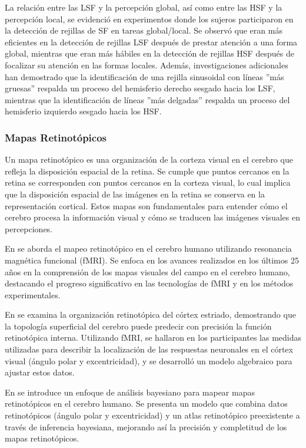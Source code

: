 La relación entre las LSF y la percepción global, así como entre las HSF y la percepción local, se evidenció en experimentos donde los sujeros participaron en la detección de rejillas de SF en tareas global/local. Se observó que eran más eficientes en la detección de rejillas LSF después de prestar atención a una forma global, mientras que eran más hábiles en la detección de rejillas HSF después de focalizar su atención en las formas locales. Además, investigaciones adicionales han demostrado que la identificación de una rejilla sinusoidal con líneas ''más gruesas'' respalda un proceso del hemisferio derecho sesgado hacia los LSF, mientras que la identificación de líneas ''más delgadas'' respalda un proceso del hemisferio izquierdo sesgado hacia los HSF. 



\subsubsection*{Mapas Retinot\'opicos}
Un mapa retinotópico es una organización de la corteza visual en el cerebro que refleja la disposición espacial de la retina. Se cumple que puntos cercanos en la retina se corresponden con puntos cercanos en la corteza visual, lo cual implica que la disposición espacial de las imágenes en la retina se conserva en la representación cortical. Estos mapas son fundamentales para entender cómo el cerebro procesa la información visual y cómo se traducen las imágenes visuales en percepciones.

En \cite{wandell_imaging_2011} se aborda el mapeo retinotópico en el cerebro humano utilizando resonancia magnética funcional (fMRI). Se enfoca en los avances realizados en los últimos 25 años en la comprensión de los mapas visuales del campo en el cerebro humano, destacando el progreso significativo en las tecnologías de fMRI y en los métodos experimentales.

En \cite{benson_retinotopic_2012} se examina la organización retinotópica del córtex estriado, demostrando que la topología superficial del cerebro puede predecir con precisión la función retinotópica interna. Utilizando fMRI, se hallaron en los participantes las medidas utilizadas para describir la localización de las respuestas neuronales en el córtex visual (ángulo polar y excentricidad), y se desarroll\'o un modelo algebraico para ajustar estos datos. 

En \cite{benson_bayesian_2018} se introduce un enfoque de análisis bayesiano para mapear mapas retinotópicos en el cerebro humano. Se presenta un modelo que combina datos retinotópicos (ángulo polar y excentricidad) y un atlas retinotópico preexistente a través de inferencia bayesiana, mejorando así la precisión y completitud de los mapas retinotópicos. 



